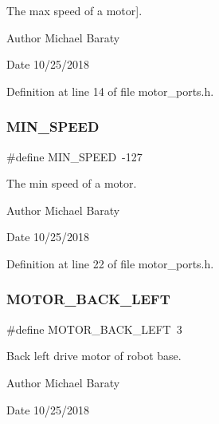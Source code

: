 The max speed of a motor]. 

\begin{DoxyAuthor}{Author}
Michael Baraty 
\end{DoxyAuthor}
\begin{DoxyDate}{Date}
10/25/2018 
\end{DoxyDate}


Definition at line 14 of file motor\+\_\+ports.\+h.

\mbox{\label{motor__ports_8h_ad5f5efaa5cb771bd06da4bfe6046809e}} 
\subsubsection{M\+I\+N\+\_\+\+S\+P\+E\+ED}
{\footnotesize\ttfamily \#define M\+I\+N\+\_\+\+S\+P\+E\+ED~-\/127}



The min speed of a motor. 

\begin{DoxyAuthor}{Author}
Michael Baraty 
\end{DoxyAuthor}
\begin{DoxyDate}{Date}
10/25/2018 
\end{DoxyDate}


Definition at line 22 of file motor\+\_\+ports.\+h.

\mbox{\label{motor__ports_8h_a36e9fda07b5cd4408170fe907b75a8b7}} 
\subsubsection{M\+O\+T\+O\+R\+\_\+\+B\+A\+C\+K\+\_\+\+L\+E\+FT}
{\footnotesize\ttfamily \#define M\+O\+T\+O\+R\+\_\+\+B\+A\+C\+K\+\_\+\+L\+E\+FT~3}



Back left drive motor of robot base. 

\begin{DoxyAuthor}{Author}
Michael Baraty 
\end{DoxyAuthor}
\begin{DoxyDate}{Date}
10/25/2018 
\end{DoxyDate}


